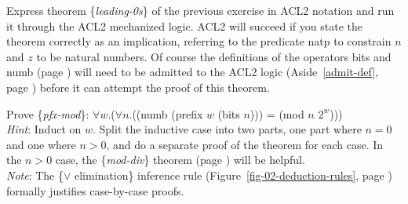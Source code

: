 \begin{ExerciseList}
\Exercise \label{leading-0s-defthm} Express theorem \{\emph{leading-0s}\}
of the previous exercise in ACL2 notation
and run it through the ACL2 mechanized logic.
ACL2 will succeed if you state the theorem correctly as an implication,
referring to the predicate natp to constrain $n$ and $z$ to be natural numbers.
Of course the definitions of the operators bits and numb (page \pageref{bits-defun})
will need to be admitted to the ACL2 logic (Aside~\ref{admit-def}, page \pageref{admit-def})
before it can attempt the proof of this theorem.

\Exercise \label{pfx-mod}
Prove \{\emph{pfx-mod}\}:
$\forall w$.($\forall n$.((numb (prefix $w$ (bits $n$))) = (mod $n$ $2^w$))) \\
\emph{Hint}: Induct on $w$. Split the inductive case into two parts,
one part where $n = 0$ and one where $n > 0$, and do a separate proof
of the theorem for each case.
In the $n > 0$ case, the \{\emph{mod-div}\} theorem
(page \pageref{modular-division}) will be helpful.\\
\emph{Note}: The \{$\vee$ elimination\} inference rule
(Figure~\ref{fig-02-deduction-rules}, page \pageref{fig-02-deduction-rules})
formally justifies case-by-case proofs.


\end{ExerciseList}
